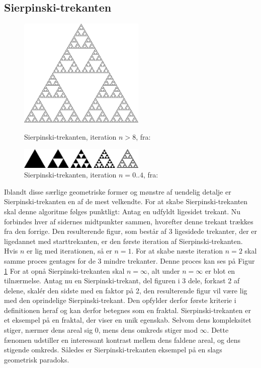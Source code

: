 \documentclass{article}
\begin{document}
\subsection{Sierpinski-trekanten}
\begin{figure}
\includegraphics[width=6cm]{Sierpinski-trekanten}
\caption{Sierpinski-trekanten, iteration $n>8$, fra: \parencite{Stanislaus_2013} }\label{wrap-fig:1}
\includegraphics[width=6cm]{Sierpinski_triangle_evolution.png}
\caption{Sierpinski-trekanten, iteration $n=0..4$, fra: \parencite{Saperaud_2006} }\label{wrap-fig:2}
\end{figure}
Iblandt disse særlige geometriske former og mønstre af uendelig detalje er Sierpinski-trekanten en af de mest velkendte. For at skabe Sierpinski-trekanten skal denne algoritme følges punktligt: Antag en udfyldt ligesidet trekant. Nu forbindes hver af sidernes midtpunkter sammen, hvorefter denne trekant trækkes fra den forrige. Den resulterende figur, som består af 3 ligesidede trekanter, der er ligedannet med starttrekanten, er den første iteration af Sierpinski-trekanten. Hvis $n$ er lig med iterationen, så er $n=1$. For at skabe næste iteration $n=2$ skal samme proces gentages for de 3 mindre trekanter. Denne proces kan ses på Figur \ref{wrap-fig:2} For at opnå Sierpinski-trekanten skal $n=\infty$, alt under $n=\infty$ er blot en tilnærmelse. Antag nu en Sierpinski-trekant, del figuren i 3 dele, forkast 2 af delene, skalér den sidste med en faktor på 2, den resulterende figur vil være lig med den oprindelige Sierpinski-trekant. Den opfylder derfor første kriterie i definitionen heraf og kan derfor betegnes som en fraktal. Sierpinski-trekanten er et eksempel på en fraktal, der viser en unik egenskab. Selvom dens kompleksitet stiger, nærmer dens areal sig $0$, mens dens omkreds stiger mod $\infty$. Dette fænomen udstiller en interessant kontrast mellem dens faldene areal, og dens stigende omkreds. Således er Sierpinski-trekanten eksempel på en slags geometrisk paradoks.\\
\end{document}

